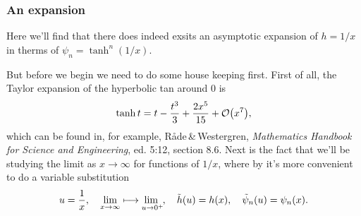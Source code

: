 \documentclass[11pt,letter, swedish, english
]{article}
\begin{document}
\subsubsection{An expansion}
\newcommand{\limu}{\ensuremath\lim_{u\to0^+\hspace{-3pt}}\hspace{+2pt}}

Here we'll find that there does indeed exsits an asymptotic expansion
of $h=1/x$ in therms of $\psi_n=\tanh^n(1/x)$. 

But before we begin we need to do some house keeping first. First of
all, the Taylor expansion of the hyperbolic tan around $0$ is
\begin{equation} \label{eq:tanh}
\tanh{t} = t - \frac{t^3}{3} + \frac{2x^5}{15} + \order{x^7},
\end{equation}
which can be found in, for example, Råde\,\&\,Westergren,
\textit{Mathematics Handbook for Science and Engineering}, ed. 5:12,
section 8.6.
Next is the fact that we'll be studying the limit as $x\to\infty$ for
functions of $1/x$, where by it's more convenient to do a variable
substitution
\begin{equation}
u=\frac{1}{x} \qcomma \lim_{x\to\infty} \longmapsto \limu\qcomma
\tilde{h}(u)=h(x)\qcomma\tilde\psi_n(u)=\psi_n(x).
\end{equation}
\end{document}
